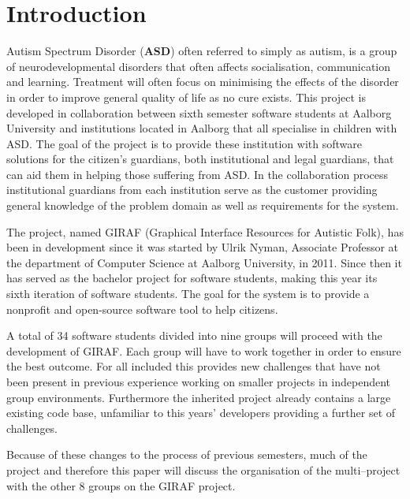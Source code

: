 \chapter{Introduction}
Autism Spectrum Disorder (\textbf{ASD}) often referred to simply as autism, is a
group of neurodevelopmental disorders that often affects socialisation, communication and learning.
Treatment will often focus on minimising the effects of the disorder in order to improve general quality of life as no cure exists\citep{autism}.
This project is developed in collaboration between sixth semester software students at Aalborg University and institutions located in Aalborg that all specialise in children with ASD.
The goal of the project is to provide these institution with software solutions for the citizen's guardians, both institutional and legal guardians, that can aid them in helping those suffering from ASD.
In the collaboration process institutional guardians from each institution serve as the customer providing general knowledge of the problem domain as well as requirements for the system.

The project, named GIRAF (Graphical Interface Resources for Autistic Folk), has been in development since it was started by Ulrik Nyman, Associate Professor at the department of Computer Science at Aalborg University, in 2011.
Since then it has served as the bachelor project for software students, making this year its sixth iteration of software students.
The goal for the system is to provide a nonprofit and open-source software tool to help citizens.

A total of 34 software students divided into nine groups will proceed with the development of GIRAF.
Each group will have to work together in order to ensure the best outcome.
For all included this provides new challenges that have not been present in previous experience working on smaller projects in independent group environments.
Furthermore the inherited project already contains a large existing code base, unfamiliar to this years' developers providing a further set of challenges.

Because of these changes to the process of previous semesters, much of the project and therefore this paper will discuss the organisation of the multi--project with the other 8 groups on the GIRAF project.
